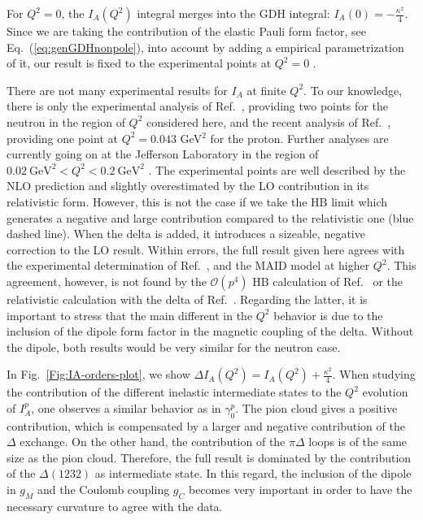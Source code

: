 \documentclass[twocolumn,prc,showpacs,nofootinbib,preprintnumbers,amsmath,amssymb,superscriptaddress]{revtex4-1}
\def\Eqref#1{Eq.~(\ref{eq:#1})}
\begin{document}
For $Q^2=0$, the $I_A(Q^2)$ integral merges into the GDH integral: $I_A (0) = - \frac{\kappa^2}{4}$.
Since we are taking the contribution of the elastic Pauli form factor, see \Eqref{genGDHnonpole}, into account by adding a empirical parametrization of it, our result is fixed to the experimental points at $Q^2=0$ \cite{Mohr:2012tt}.

There are not many experimental results for $I_A$ at finite $Q^2$.
To our knowledge, there is only the experimental analysis of Ref.~\cite{Amarian:2002ar}, providing two points for the neutron in the region of $Q^2$ considered here, and the recent analysis of Ref.~\cite{Zielinski:2017gwp}, providing one point at $Q^2=0.043$ GeV$^2$ for the proton.
Further analyses are currently going on at the Jefferson Laboratory in the region of $0.02~\text{GeV}^2<Q^2<0.2~\text{GeV}^2$ \cite{Exp-new-E08-027,Zielinski:2017gwp,Exp-new-E97-110}. The experimental points are well described by the NLO prediction and slightly overestimated by the LO contribution in its relativistic form.
However, this is not the case if we take the HB limit which generates a negative and large contribution compared to the relativistic one (blue dashed line).
When the delta is added, it introduces a sizeable, negative correction to the LO result.
Within errors, the full result given here agrees with the experimental determination of Ref.~\cite{Amarian:2002ar}, and the MAID model at higher $Q^2$. 
This agreement, however, is not found by the $\mathcal{O}(p^4)$ HB calculation of Ref.~\cite{Kao:2002cp} or the relativistic calculation with the delta of Ref.~\cite{Bernard:2012hb}.
Regarding the latter, it is important to stress that the main different in the $Q^2$ behavior is due to the inclusion of the dipole form factor in the magnetic coupling of the delta.
Without the dipole, both results would be very similar for the neutron case.

In Fig.~\ref{Fig:IA-orders-plot}, we show $\Delta I_A(Q^2)=I_A(Q^2)+\frac{\kappa^2}{4}$.
When studying the contribution of the different inelastic intermediate states to the $Q^2$ evolution of $I_A^p$, one observes a similar behavior as in $\gamma_0^p$. 
The pion cloud gives a positive contribution, which is compensated by a larger and negative contribution of the $\Delta$ exchange.
On the other hand, the contribution of the $\pi \Delta$ loops is of the same size as the pion cloud. 
Therefore, the full result is dominated by the contribution of the $\Delta(1232)$ as intermediate state.
In this regard, the inclusion of the dipole in $g_M$ and the Coulomb coupling $g_C$ becomes very important in order to have the necessary curvature to agree with the data.
\end{document}
